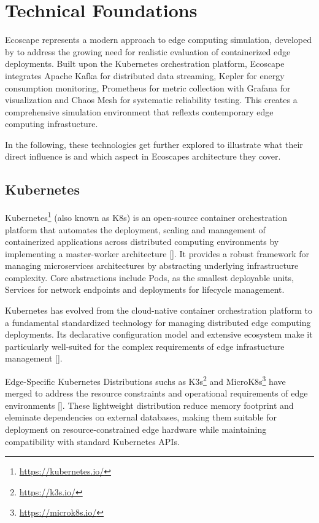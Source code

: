 
\section{Technical Foundations}
Ecoscape represents a modern approach to edge computing simulation, developed by \cite{reiter2025ecoscapefaulttolerancebenchmark} to address the growing need for realistic evaluation of containerized edge deployments.
Built upon the Kubernetes orchestration platform, Ecoscape integrates Apache Kafka for distributed data streaming, Kepler for energy consumption monitoring, Prometheus for metric collection with Grafana for visualization and Chaos Mesh for systematic reliability testing.
This creates a comprehensive simulation environment that reflexts contemporary edge computing infrastucture.

In the following, these technologies get further explored to illustrate what their direct influence is and which aspect in Ecoscapes architecture they cover.
\subsection{Kubernetes}
Kubernetes\footnote{\url{https://kubernetes.io/}} (also known as K8s) is an open-source container orchestration platform that automates the deployment, scaling and management of containerized applications across distributed computing environments by implementing a master-worker architecture [\cite{10.5555/3175917}].
It provides a robust framework for managing microservices architectures by abstracting underlying infrastructure complexity.
Core abstractions include Pods, as the smallest deployable units, Services for network endpoints and deployments for lifecycle management.

Kubernetes has evolved from the cloud-native container orchestration platform to a fundamental standardized technology for managing distributed edge computing deployments.
Its declarative configuration model and extensive ecosystem make it particularly well-suited for the complex requirements of edge infrastucture management [\cite{10.1145/3539606}].

Edge-Specific Kubernetes Distributions suchs as K3s\footnote{\url{https://k3s.io/}} and MicroK8s\footnote{\url{https://microk8s.io/}} have merged to address the resource constraints and operational requirements of edge environments [\cite{10.1145/3578244.3583737}].
These lightweight distribution reduce memory footprint and eleminate dependencies on external databases, making them suitable for deployment on resource-constrained edge hardware while maintaining compatibility with standard Kubernetes APIs.

